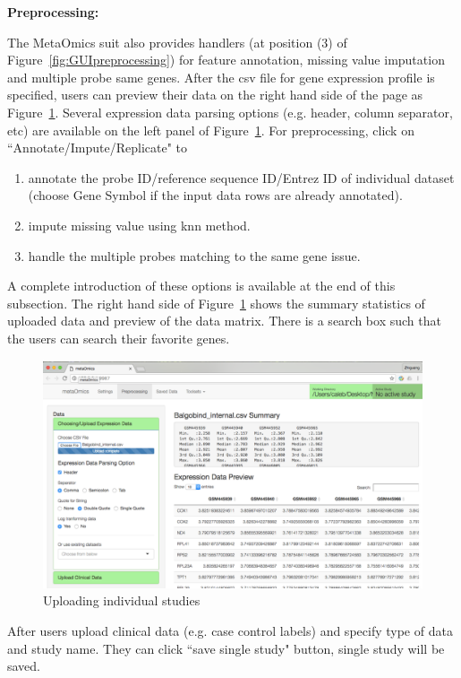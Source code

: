 \begin{steps}
\item \textbf{Preprocessing:}

The MetaOmics suit also provides handlers (at position {\color{red} (3)} of Figure~\ref{fig:GUIpreprocessing}) for feature annotation, missing value imputation and multiple probe same genes.
After the csv file for gene expression profile is specified, 
users can preview their data on the right hand side of the page as Figure~\ref{fig:GUIpreview}.
Several expression data parsing options (e.g. header, column separator, etc) are available on the left panel of Figure~\ref{fig:GUIpreview}.
For preprocessing, 
click on ``Annotate/Impute/Replicate" to 
\begin{enumerate}
\item annotate the probe ID/reference sequence ID/Entrez ID of individual dataset (choose Gene Symbol if the input data rows are already annotated).
\item impute missing value using knn method.
\item handle the multiple probes matching to the same gene issue.
\end{enumerate}

A complete introduction of these options is available at the end of this subsection.
The right hand side of Figure~\ref{fig:GUIpreview} shows the summary statistics of uploaded data and preview of the data matrix.
There is a search box such that the users can search their favorite genes.

\begin{figure}[H]
\begin{center}
\includegraphics[scale=0.6]{./figure/preprocessing/GUIpreview}
\caption{Uploading individual studies}
\label{fig:GUIpreview}
\end{center}
\end{figure}
After users upload clinical data (e.g. case control labels) and specify type of data and study name.
They can click ``save single study" button, single study will be saved.


\end{steps}
